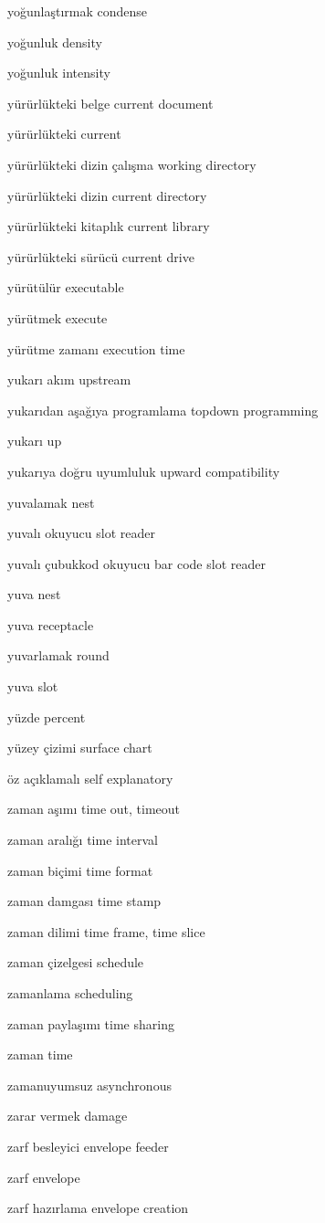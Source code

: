 \documentclass[12pt,fleqn]{article}\usepackage{../../common}
\begin{document}
yoğunlaştırmak condense

yoğunluk density

yoğunluk intensity

yürürlükteki belge current document

yürürlükteki current

yürürlükteki dizin çalışma working directory

yürürlükteki dizin current directory

yürürlükteki kitaplık current library

yürürlükteki sürücü current drive

yürütülür executable

yürütmek execute

yürütme zamanı execution time

yukarı akım upstream

yukarıdan aşağıya programlama topdown programming

yukarı up

yukarıya doğru uyumluluk upward compatibility

yuvalamak nest

yuvalı okuyucu slot reader

yuvalı çubukkod okuyucu bar code slot reader

yuva nest

yuva receptacle

yuvarlamak round

yuva slot

yüzde percent

yüzey çizimi surface chart

öz açıklamalı self explanatory

zaman aşımı time out, timeout

zaman aralığı time interval

zaman biçimi time format

zaman damgası time stamp

zaman dilimi time frame, time slice

zaman çizelgesi schedule

zamanlama scheduling

zaman paylaşımı time sharing

zaman time

zamanuyumsuz asynchronous

zarar vermek damage

zarf besleyici envelope feeder

zarf envelope

zarf hazırlama envelope creation
\end{document}
